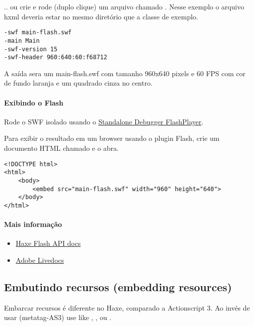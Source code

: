 .. ou crie e rode (duplo clique) um arquivo chamado . Nesse exemplo o arquivo hxml deveria estar no mesmo diretório que a classe de exemplo.

\begin{lstlisting}
-swf main-flash.swf
-main Main
-swf-version 15
-swf-header 960:640:60:f68712
\end{lstlisting}

A saída sera um main-flash.swf com tamanho 960x640 pixels e 60 FPS com cor de fundo laranja e um quadrado cinza no centro.

\paragraph{Exibindo o Flash}

Rode o SWF isolado usando o \href{https://www.adobe.com/support/flashplayer/downloads.html}{Standalone Debugger FlashPlayer}. 

Para exibir o resultado em um browser usando o plugin Flash, crie um documento HTML chamado  e o abra.

\begin{lstlisting}
<!DOCTYPE html>
<html>
	<body>
		<embed src="main-flash.swf" width="960" height="640">
	</body>
</html>
\end{lstlisting}

\paragraph{Mais informação}

\begin{itemize}
	\item \href{http://api.haxe.org/flash/}{Haxe Flash API docs}
	\item \href{http://help.adobe.com/en_US/FlashPlatform/reference/actionscript/3/}{Adobe Livedocs}
\end{itemize}

\subsection{Embutindo recursos (embedding resources)}
\label{target-flash-resources}

Embarcar recursos é diferente no Haxe, comparado a Actionscript 3. Ao invés de usar \ic{\[embed\]} (metatag-AS3) use  like , ,  ou .

